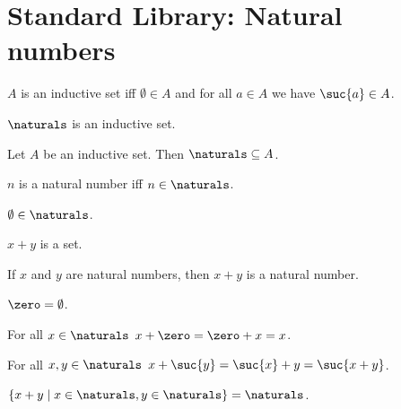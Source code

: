 \section{Standard Library: Natural numbers}

\begin{abbreviation}\label{num_inductive_set}
    $A$ is an inductive set iff $\emptyset\in A$ and for all $a\in A$ we have $\suc{a}\in A$.
\end{abbreviation}

\begin{axiom}\label{num_naturals_inductive_set}
    $\naturals$ is an inductive set.
\end{axiom}

\begin{axiom}\label{num_naturals_smallest_inductive_set}
    Let $A$ be an inductive set.
    Then $\naturals\subseteq A$.
\end{axiom}

\begin{abbreviation}\label{num_naturalnumber}
    $n$ is a natural number iff $n\in \naturals$.
\end{abbreviation}

\begin{lemma}\label{num_emptyset_in_naturals}
    $\emptyset\in\naturals$.    
\end{lemma}

\begin{signature}\label{num_addition_is_set}
    $x+y$ is a set.
\end{signature}

\begin{axiom}\label{num_addition_on_naturals}
    If $x$ and $y$ are natural numbers, then $x + y$ is a natural number.
\end{axiom}

\begin{abbreviation}\label{num_zero_is_emptyset}
    $\zero = \emptyset$.
\end{abbreviation}

\begin{axiom}\label{num_addition_axiom_1}
    For all $x \in \naturals$ $x + \zero = \zero + x = x$.
\end{axiom}

\begin{axiom}\label{num_addition_axiom_2}
    For all $x, y \in \naturals$ $x + \suc{y} = \suc{x} + y = \suc{x+y}$.
\end{axiom}

\begin{lemma}\label{num_naturals_is_equal_to_two_times_naturals}
    $\{x+y \mid x \in \naturals, y \in \naturals \} = \naturals$.
\end{lemma}


